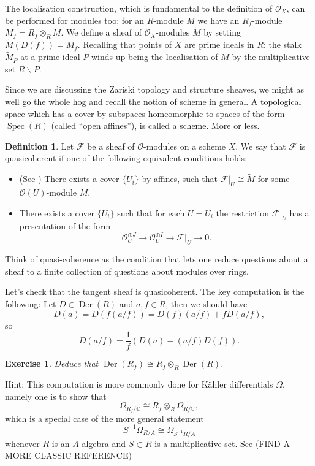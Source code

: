 \documentclass[12pt]{article}
\theoremstyle{plain}
\newtheorem{exer}[thm]{Exercise}
\theoremstyle{definition}
\newtheorem{defn}{Definition}[section]
\numberwithin{equation}{section}
\DeclareMathOperator{\spec}{Spec}
\DeclareMathOperator{\Der}{Der}
\newcommand{\wtil}[1]{\widetilde{#1}}
\newcommand{\Om}{\Omega}
\newcommand{\C}{\mathbb{C}}
\newcommand{\CF}{\mathcal{F}}
\newcommand{\OO}{\mathcal{O}}
\begin{document}
The localisation construction, which is fundamental to the definition of $\OO_X$, can be performed for modules too: for an $R$-module $M$ we have an $R_f$-module $M_f = R_f \otimes_R M$. We define a sheaf of $\OO_X$-modules $\wtil{M}$ by setting $\wtil{M}(D(f)) = M_f$. Recalling that points of $X$ are prime ideals in $R$: the stalk $\wtil{M}_P$ at a prime ideal $P$ winds up being the localisation of $M$ by the multiplicative set $R \backslash P$.


Since we are discussing the Zariski topology and structure sheaves, we might as well go the whole hog and recall the notion of scheme in general. A topological space which has a cover by subspaces homeomorphic to spaces of the form $\spec(R)$ (called ``open affines''), is called a scheme. More or less.
\begin{defn}
Let $\CF$ be a sheaf of $\OO$-modules on a scheme $X$. We say that $\CF$ is quasicoherent if one of the following equivalent conditions holds:
\begin{itemize}
\item (See {\cite[Definition 13.2.2]{Vakil}}) There exists a cover $\{U_i\}$ by affines, such that $\CF|_U \cong \wtil{M}$ for some $\OO(U)$-module $M$.

\item There exists a cover $\{U_i\}$ such that for each $U = U_i$ the restriction $\CF|_U$ has a presentation of the form
\[
\OO_U^{\oplus J} \rightarrow  \OO_U^{\oplus I} \rightarrow \CF|_U \rightarrow 0.
\]
\end{itemize}
\end{defn}
Think of quasi-coherence as the condition that lets one reduce questions about a sheaf to a finite collection of questions about modules over rings.


Let's check that the tangent sheaf is quasicoherent. The key computation is the following: Let $D \in \Der(R)$ and $a, f \in R$, then we should have
\[
D(a) = D(f (a/f)) = D(f) (a/f) + f D(a/f),
\]
so
\[
D(a/f) = \frac{1}{f} \left( D(a) - (a/f) D(f) \right).
\]


\begin{exer}\label{exer:TX.localises}
Deduce that $\Der(R_f) \cong R_f \otimes_R \Der(R)$.
\end{exer}
Hint: This computation is more commonly done for K\"{a}hler differentials $\Om$, namely one is to show that
\[
\Om_{R_f / \C} \cong R_f \otimes_R \Om_{R / \C},
\]
which is a special case of the more general statement
\[
S^{-1} \Om_{R / A} \cong \Om_{S^{-1}R / A}
\]
whenever $R$ is an $A$-algebra and $S \subset R$ is a multiplicative set. See {\cite[p. 328]{Akhil.CRing}} (FIND A MORE CLASSIC REFERENCE)
\end{document}
